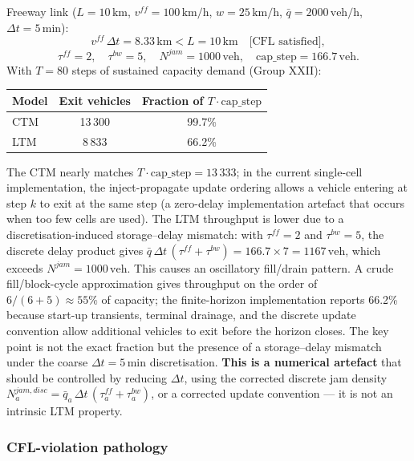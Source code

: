 Freeway link ($L = 10\,\text{km}$, $v^{ff} = 100\,\text{km/h}$,
$w = 25\,\text{km/h}$, $\bar{q} = 2000\,\text{veh/h}$, $\Delta t = 5\,\text{min}$):
\begin{equation*}
  v^{ff}\,\Delta t = 8.33\,\text{km} < L = 10\,\text{km}
  \quad\text{[CFL satisfied]},
\end{equation*}
\begin{equation*}
  \tau^{ff} = 2, \quad \tau^{bw} = 5, \quad
  N^{jam} = 1000\,\text{veh}, \quad
  \text{cap\_step} = 166.7\,\text{veh}.
\end{equation*}
With $T = 80$ steps of sustained capacity demand (Group XXII):
\begin{center}
\begin{tabular}{lcc}
\toprule
Model & Exit vehicles & Fraction of $T\cdot\text{cap\_step}$ \\
\midrule
CTM & 13\,300 & 99.7\% \\
LTM & 8\,833  & 66.2\% \\
\bottomrule
\end{tabular}
\end{center}
The CTM nearly matches $T \cdot \text{cap\_step} = 13\,333$; in the current
single-cell implementation, the inject-propagate update ordering allows a
vehicle entering at step $k$ to exit at the same step (a zero-delay
implementation artefact that occurs when too few cells are used).
The LTM throughput is lower due to a discretisation-induced
storage--delay mismatch: with $\tau^{ff}=2$ and $\tau^{bw}=5$, the
discrete delay product gives
$\bar{q}\,\Delta t\,(\tau^{ff}+\tau^{bw}) = 166.7 \times 7 = 1167\,\text{veh}$,
which exceeds $N^{jam} = 1000\,\text{veh}$.  This causes an oscillatory
fill/drain pattern.  A crude fill/block-cycle approximation gives
throughput on the order of $6/(6+5)\approx 55\%$ of capacity; the
finite-horizon implementation reports 66.2\% because start-up transients,
terminal drainage, and the discrete update convention allow additional
vehicles to exit before the horizon closes.  The key point is not the
exact fraction but the presence of a storage--delay mismatch under the
coarse $\Delta t=5\,\text{min}$ discretisation.
\textbf{This is a numerical artefact} that should be controlled by
reducing $\Delta t$, using the corrected discrete jam density
$N^{jam,disc}_a = \bar{q}_a\,\Delta t\,(\tau^{ff}_a+\tau^{bw}_a)$,
or a corrected update convention --- it is not an intrinsic LTM property.

\subsubsection{CFL-violation pathology}

